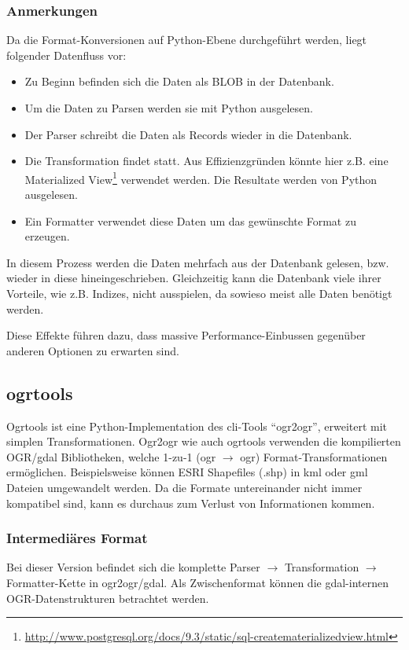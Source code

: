 \subsubsection{Anmerkungen}

Da die Format-Konversionen auf Python-Ebene durchgeführt werden, liegt folgender Datenfluss vor:
\begin{itemize}
\item Zu Beginn befinden sich die Daten als BLOB in der Datenbank.
\item Um die Daten zu Parsen werden sie mit Python ausgelesen.
\item Der Parser schreibt die Daten als Records wieder in die Datenbank.
\item Die Transformation findet statt. Aus Effizienzgründen könnte hier z.B. eine Materialized View\footnote{\url{http://www.postgresql.org/docs/9.3/static/sql-creatematerializedview.html}} verwendet werden. Die Resultate werden von Python ausgelesen.
\item Ein Formatter verwendet diese Daten um das gewünschte Format zu erzeugen.
\end{itemize}

In diesem Prozess werden die Daten mehrfach aus der Datenbank gelesen, bzw. wieder in diese hineingeschrieben. Gleichzeitig kann die Datenbank viele ihrer Vorteile, wie z.B. Indizes, nicht ausspielen, da sowieso meist alle Daten benötigt werden.

Diese Effekte führen dazu, dass massive Performance-Einbussen gegenüber anderen Optionen zu erwarten sind.

\subsection{ogrtools}

Ogrtools ist eine Python-Implementation des \acs{cli}-Tools ``ogr2ogr'', erweitert mit simplen Transformationen. Ogr2ogr wie auch ogrtools verwenden die kompilierten OGR/\gls{gdal} Bibliotheken, welche 1-zu-1 (ogr $\to$ ogr) Format-Transformationen ermöglichen. Beispielsweise können ESRI Shapefiles (.shp) in \gls{kml} oder \gls{gml} Dateien umgewandelt werden. Da die Formate untereinander nicht immer kompatibel sind, kann es durchaus zum Verlust von Informationen kommen.

\subsubsection{Intermediäres Format}
Bei dieser Version befindet sich die komplette Parser $\to$ Transformation $\to$ Formatter-Kette in ogr2ogr/\gls{gdal}. Als Zwischenformat können die \gls{gdal}-internen OGR-Datenstrukturen betrachtet werden.

